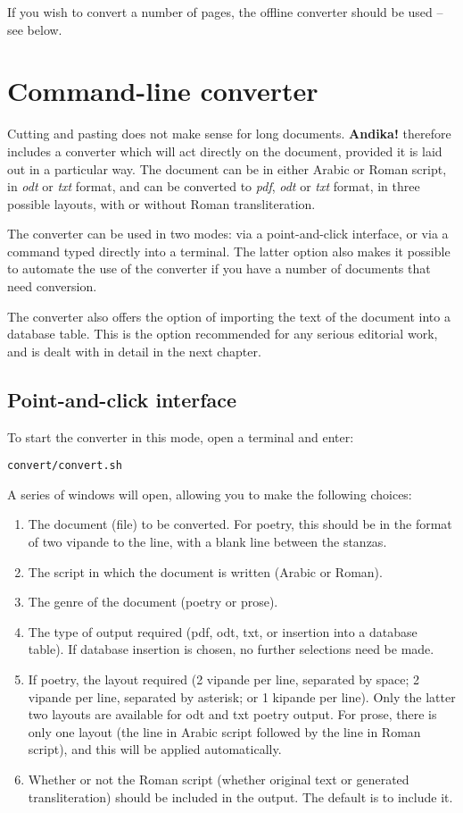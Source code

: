 \documentclass[a4paper,10pt, oneside]{book}
\begin{document}
If you wish to convert a number of pages, the offline converter should be used -- see  below.


\section{Command-line converter}

Cutting and pasting does not make sense for long documents.  \textbf{Andika!} therefore includes a converter which will act directly on the document, provided it is laid out in a particular way.  The document can be in either Arabic or Roman script, in \textit{odt} or \textit{txt} format, and can be converted to \textit{pdf}, \textit{odt} or \textit{txt} format, in three possible layouts, with or without Roman transliteration.

The converter can be used in two modes: via a point-and-click interface, or via a command typed directly into a terminal.  The latter option also makes it possible to automate the use of the converter if you have a number of documents that need conversion.

The converter also offers the option of importing the text of the document into a database table.  This is the option recommended for any serious editorial work, and is dealt with in detail in the next chapter.

\subsection{Point-and-click interface}

To start the converter in this mode, open a terminal and enter:

\verb|convert/convert.sh|

A series of windows will open, allowing you to make the following choices:
\begin{enumerate}
\item The document (file) to be converted.  For poetry, this should be in the format of two vipande to the line, with a blank line between the stanzas.
\item The script in which the document is written (Arabic or Roman).
\item The genre of the document (poetry or prose).
\item The type of output required (pdf, odt, txt, or insertion into a database table).  If database insertion is chosen, no further selections need be made.
\item If poetry, the layout required (2 vipande per line, separated by space; 2 vipande per line, separated by asterisk; or 1 kipande per line).  Only the latter two layouts are available for odt and txt poetry output.  For prose, there is only one layout (the line in Arabic script followed by the line in Roman script), and this will be applied automatically.
\item Whether or not the Roman script (whether original text or generated transliteration) should be included in the output.  The default is to include it.
\end{enumerate}
\end{document}
